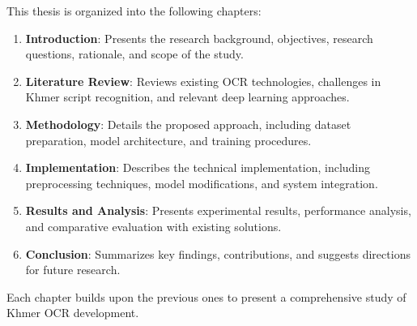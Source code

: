 This thesis is organized into the following chapters:

\begin{enumerate}
    \item \textbf{Introduction}: Presents the research background, objectives, research questions, rationale, and scope of the study.
    
    \item \textbf{Literature Review}: Reviews existing OCR technologies, challenges in Khmer script recognition, and relevant deep learning approaches.
    
    \item \textbf{Methodology}: Details the proposed approach, including dataset preparation, model architecture, and training procedures.
    
    \item \textbf{Implementation}: Describes the technical implementation, including preprocessing techniques, model modifications, and system integration.
    
    \item \textbf{Results and Analysis}: Presents experimental results, performance analysis, and comparative evaluation with existing solutions.
    
    \item \textbf{Conclusion}: Summarizes key findings, contributions, and suggests directions for future research.
\end{enumerate}

Each chapter builds upon the previous ones to present a comprehensive study of Khmer OCR development.